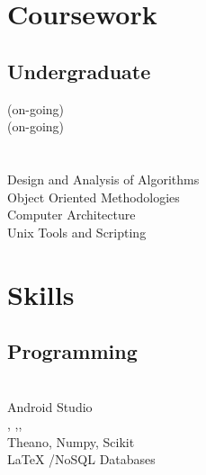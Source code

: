 \documentclass[]{deedy-resume-openfont}
\begin{document}
\begin{minipage}[t]{0.33\textwidth}

\section{Coursework}

\subsection{Undergraduate}
 (on-going) \\
(on-going)\\
\\
 \\
Design and Analysis of Algorithms\\
Object Oriented Methodologies \\
Computer Architecture\\
Unix Tools and Scripting \\
\sectionsep


\section{Skills}
\subsection{Programming}
 \textbullet{}    \textbullet{}  \textbullet{}  \\
 \textbullet{}  \textbullet{} Android Studio \\
, ,,\\ Theano, Numpy, Scikit\\
 \textbullet{}  \textbullet{} \textbullet{} \LaTeX \textbullet{} /NoSQL Databases
\sectionsep

%
%

\end{minipage}
\end{document}
